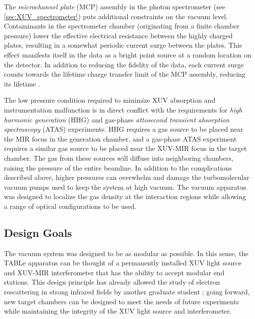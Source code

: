 The \textit{microchannel plate} (MCP) assembly in the photon spectrometer (see \cref{sec:XUV_spectrometer}) puts additional constraints on the vacuum level. Contaminants in the spectrometer chamber (originating from a finite chamber pressure) lower the effective electrical resistance between the highly charged plates, resulting in a somewhat periodic current surge between the plates. This effect manifests itself in the data as a bright point source at a random location on the detector. In addition to reducing the fidelity of the data, each current surge counts towards the lifetime charge transfer limit of the MCP assembly, reducing its lifetime \cite{ladislaswizaMicrochannelPlateDetectors1979}.

The low pressure condition required to minimize XUV absorption and instrumentation malfunction is in direct conflict with the requirements for \textit{high harmonic generation} (HHG) and gas-phase \textit{attosecond transient absorption spectroscopy} (ATAS) experiments. HHG requires a gas source to be placed near the MIR focus in the generation chamber, and a gas-phase ATAS experiment requires a similar gas source to be placed near the XUV-MIR focus in the target chamber. The gas from these sources will diffuse into neighboring chambers, raising the pressure of the entire beamline. In addition to the complications described above, higher pressures can overwhelm and damage the turbomolecular vacuum pumps used to keep the system at high vacuum. The vacuum apparatus was designed to localize the gas density at the interaction regions while allowing a range of optical configurations to be used.

\subsection{Design Goals}

The vacuum system was designed to be as modular as possible. In this sense, the TABLe apparatus can be thought of a permanently installed XUV light source and XUV-MIR interferometer that has the ability to accept modular end stations. This design principle has already allowed the study of electron rescattering in strong infrared fields by another graduate student \cite{kiesewetterDynamicsNearThresholdAttosecond2019}; going forward, new target chambers can be designed to meet the needs of future experiments while maintaining the integrity of the XUV light source and interferometer.

